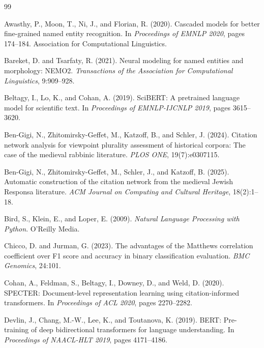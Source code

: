 \documentclass[11pt,a4paper]{article}
\begin{document}
\begin{thebibliography}{99}

Awasthy, P., Moon, T., Ni, J., and Florian, R. (2020).
Cascaded models for better fine-grained named entity recognition.
In \emph{Proceedings of EMNLP 2020}, pages 174--184. Association for Computational Linguistics.

Bareket, D. and Tsarfaty, R. (2021).
Neural modeling for named entities and morphology: NEMO2.
\emph{Transactions of the Association for Computational Linguistics}, 9:909--928.

Beltagy, I., Lo, K., and Cohan, A. (2019).
SciBERT: A pretrained language model for scientific text.
In \emph{Proceedings of EMNLP-IJCNLP 2019}, pages 3615--3620.

Ben-Gigi, N., Zhitomirsky-Geffet, M., Katzoff, B., and Schler, J. (2024).
Citation network analysis for viewpoint plurality assessment of historical corpora: The case of the medieval rabbinic literature.
\emph{PLOS ONE}, 19(7):e0307115.

Ben-Gigi, N., Zhitomirsky-Geffet, M., Schler, J., and Katzoff, B. (2025).
Automatic construction of the citation network from the medieval Jewish Responsa literature.
\emph{ACM Journal on Computing and Cultural Heritage}, 18(2):1--18.

Bird, S., Klein, E., and Loper, E. (2009).
\emph{Natural Language Processing with Python}. O'Reilly Media.

Chicco, D. and Jurman, G. (2023).
The advantages of the Matthews correlation coefficient over F1 score and accuracy in binary classification evaluation.
\emph{BMC Genomics}, 24:101.

Cohan, A., Feldman, S., Beltagy, I., Downey, D., and Weld, D. (2020).
SPECTER: Document-level representation learning using citation-informed transformers.
In \emph{Proceedings of ACL 2020}, pages 2270--2282.

Devlin, J., Chang, M.-W., Lee, K., and Toutanova, K. (2019).
BERT: Pre-training of deep bidirectional transformers for language understanding.
In \emph{Proceedings of NAACL-HLT 2019}, pages 4171--4186.


\end{thebibliography}
\end{document}
